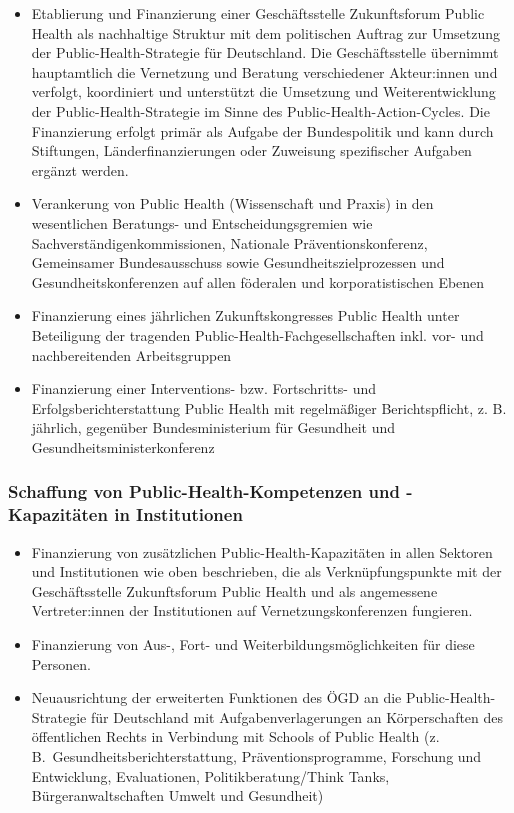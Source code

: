 \documentclass{article}
\begin{document}
\begin{itemize}
\item Etablierung und Finanzierung einer Geschäftsstelle Zukunftsforum Public Health als nachhaltige Struktur mit dem politischen Auftrag zur Umsetzung der Public-Health-Strategie für Deutschland. Die Geschäftsstelle übernimmt hauptamtlich die Vernetzung und Beratung verschiedener Akteur:innen und verfolgt, koordiniert und unterstützt die Umsetzung und Weiterentwicklung der Public-Health-Strategie im Sinne des Public-Health-Action-Cycles. Die Finanzierung erfolgt primär als Aufgabe der Bundespolitik und kann durch Stiftungen, Länderfinanzierungen oder Zuweisung spezifischer Aufgaben ergänzt werden.


\item Verankerung von Public Health (Wissenschaft und Praxis) in den wesentlichen Beratungs- und Entscheidungsgremien wie Sachverständigenkommissionen, Nationale Präventionskonferenz, Gemeinsamer Bundesausschuss sowie Gesundheitszielprozessen und Gesundheitskonferenzen auf allen föderalen und korporatistischen Ebenen


\item Finanzierung eines jährlichen Zukunftskongresses Public Health unter Beteiligung der tragenden Public-Health-Fachgesellschaften inkl. vor- und nachbereitenden Arbeitsgruppen


\item Finanzierung einer Interventions- bzw. Fortschritts- und Erfolgsberichterstattung Public Health mit regelmäßiger Berichtspflicht, z. B. jährlich, gegenüber Bundesministerium für Gesundheit und Gesundheitsministerkonferenz


\end{itemize}

\subsubsection{Schaffung von Public-Health-Kompetenzen und -Kapazitäten in Institutionen}\label{H1666140}


\begin{itemize}
\item Finanzierung von zusätzlichen Public-Health-Kapazitäten in allen Sektoren und Institutionen wie oben beschrieben, die als Verknüpfungspunkte mit der Geschäftsstelle Zukunftsforum Public Health und als angemessene Vertreter:innen der Institutionen auf Vernetzungskonferenzen fungieren. 


\item Finanzierung von Aus-, Fort- und Weiterbildungsmöglichkeiten für diese Personen. 


\item Neuausrichtung der erweiterten Funktionen des ÖGD an die Public-Health-Strategie für Deutschland mit Aufgabenverlagerungen an Körperschaften des öffentlichen Rechts in Verbindung mit Schools of Public Health (z. B. Gesundheitsberichterstattung, Präventionsprogramme, Forschung und Entwicklung, Evaluationen, Politikberatung/Think Tanks, Bürgeranwaltschaften Umwelt und Gesundheit)


\end{itemize}
\end{document}
